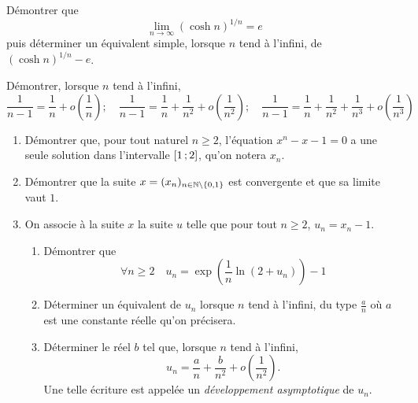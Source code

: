 \begin{exercice}
    Démontrer que \[\lim\limits_{n\to \infty} (\cosh n)^{1/n} = e\] puis déterminer un équivalent simple, lorsque \(n\) tend à l'infini, de \((\cosh n)^{1/n} - e\).
\end{exercice}
\begin{exercice}
    Démontrer, lorsque \(n\) tend à l'infini,
    \[ \frac{1}{n-1} = \frac{1}{n} + o\left(\frac{1}{n}\right); \quad \frac{1}{n-1} = \frac{1}{n} + \frac{1}{n^2} + o\left(\frac{1}{n^2}\right); \quad \frac{1}{n-1} = \frac{1}{n} + \frac{1}{n^2}+ \frac{1}{n^3} + o\left(\frac{1}{n^3}\right)\]
\end{exercice}
\begin{exercice}
    \begin{enumerate}
        \item Démontrer que, pour tout naturel \(n \geqslant 2\), l'équation \(x^n-x-1=0\) a une seule solution dans l'intervalle \(\left[ 1 \, ;  2 \right]\), qu'on notera \(x_n\).
        \item Démontrer que la suite \(x = (x_n)_{n \in \mathbb{N}\setminus\{0,1\}}\) est convergente et que sa limite vaut \(1\).
        \item On associe à la suite \(x\) la suite \(u\) telle que pour tout \(n \geqslant 2\), \(u_n=x_n-1\).
            \begin{enumerate}
                \item Démontrer que 
                    \[\forall n \geqslant 2 \quad u_n = \exp\left(\frac{1}{n}\ln(2+u_n)\right)-1\]
                \item Déterminer un équivalent de \(u_n\) lorsque \(n\) tend à l'infini, du type \(\frac{a}{n}\) où \(a\) est une constante réelle qu'on précisera.
                \item Déterminer le réel \(b\) tel que, lorsque \(n\) tend à l'infini,
                    \[u_n = \frac{a}{n} + \frac{b}{n^2} +o\left(\frac{1}{n^2}\right).\]
                    Une telle écriture est appelée un \emph{développement asymptotique} de \(u_n\).
            \end{enumerate}
    \end{enumerate}
\end{exercice}
